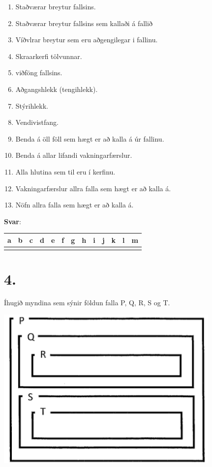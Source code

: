 \documentclass{article}
\begin{document}
    \begin{enumerate}[label = \alph*)]
        \item Staðværar breytur fallsins.
        \item Staðværar breytur fallsins sem kallaði á fallið
        \item Víðvlrar breytur sem eru aðgengilegar i fallinu.
        \item Skraarkerfi tölvunnar.
        \item viðföng fallsins.
        \item Aðgangshlekk (tengihlekk).
        \item Stýrihlekk.
        \item Vendivistfang.
        \item Benda á öll föll sem hægt er að kalla á úr fallinu.
        \item Benda á allar lifandi vakningarfærslur. 
        \item Alla hlutina sem til eru í kerfinu.
        \item Vakningarfærslur allra falla sem hægt er að kalla á.
        \item Nöfn allra falla sem hægt er að kalla á.
    \end{enumerate}

    \textbf{Svar}:

    \begin{tabularx}{\textwidth}{ |X|X|X|X|X|X|X|X|X|X|X|X|X|}
        \hline
        \textbf{a}  & \textbf{b}  & \textbf{c}  & \textbf{d}  & \textbf{e}  & \textbf{f}  & \textbf{g}  & \textbf{h}  & \textbf{i}  & \textbf{j}  & \textbf{k}  & \textbf{l} & \textbf{m}   \\ \hline
         & & & & & & & & & & & & \\ \hline
     \end{tabularx}

     \newpage

     \section{4.}
     Íhugið myndina sem sýnir földun falla P, Q, R, S og T.

     \begin{center}
        \includegraphics[scale = 1]{myndir/foldun.png}
     \end{center}
\end{document}
